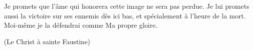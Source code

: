 Je promets que l’âme qui honorera cette image ne sera pas perdue. Je lui promets aussi la victoire sur ses ennemis dès ici bas, et spécialement à l’heure de la mort. Moi-même je la défendrai comme Ma propre gloire.\par (Le Christ à sainte Faustine)
